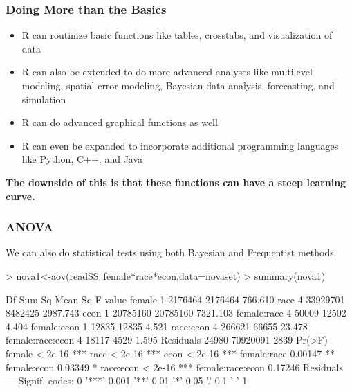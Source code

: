 \documentclass{beamer}
\begin{document}
\begin{frame}
\frametitle{Doing More than the Basics}
  \begin{itemize}
  \item R can routinize basic functions like tables, crosstabs, and visualization of data
  \item R can also be extended to do more advanced analyses like multilevel modeling, spatial error modeling, Bayesian data analysis, forecasting, and simulation
  \item R can do advanced graphical functions as well
  \item R can even be expanded to incorporate additional programming languages like Python, C++, and Java
  \end{itemize}
\textbf{The downside of this is that these functions can have a steep learning curve.}
\end{frame}

\begin{frame}[containsverbatim]
\frametitle{ANOVA}
We can also do statistical tests using both Bayesian and Frequentist methods.
\begin{Schunk}
\begin{Sinput}
> nova1<-aov(readSS~female*race*econ,data=novaset)
> summary(nova1)
\end{Sinput}
\begin{Soutput}
                    Df   Sum Sq  Mean Sq  F value
female               1  2176464  2176464  766.610
race                 4 33929701  8482425 2987.743
econ                 1 20785160 20785160 7321.103
female:race          4    50009    12502    4.404
female:econ          1    12835    12835    4.521
race:econ            4   266621    66655   23.478
female:race:econ     4    18117     4529    1.595
Residuals        24980 70920091     2839         
                  Pr(>F)    
female           < 2e-16 ***
race             < 2e-16 ***
econ             < 2e-16 ***
female:race      0.00147 ** 
female:econ      0.03349 *  
race:econ        < 2e-16 ***
female:race:econ 0.17246    
Residuals                   
---
Signif. codes:  0 '***' 0.001 '**' 0.01 '*' 0.05 '.' 0.1 ' ' 1 
\end{Soutput}
\end{Schunk}
\end{frame}
\end{document}
